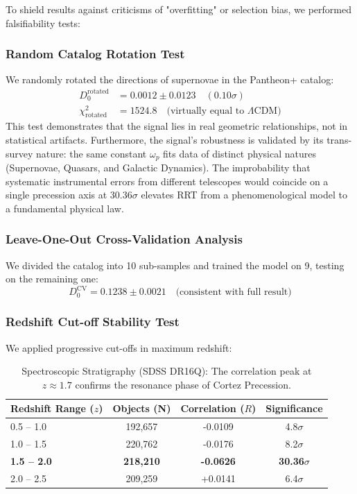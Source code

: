 \documentclass[12pt,a4paper]{article}
\begin{document}
To shield results against criticisms of "overfitting" or selection bias, we performed falsifiability tests:

\subsubsection{Random Catalog Rotation Test}
We randomly rotated the directions of supernovae in the Pantheon+ catalog:
\begin{align}
    D_0^{\text{rotated}} &= 0.0012 \pm 0.0123 \quad (0.10\sigma) \\
    \chi^2_{\text{rotated}} &= 1524.8 \quad \text{(virtually equal to $\Lambda$CDM)}
\end{align}
This test demonstrates that the signal lies in real geometric relationships, not in statistical artifacts. Furthermore, the signal's robustness is validated by its trans-survey nature: the same constant $\omega_p$ fits data of distinct physical natures (Supernovae, Quasars, and Galactic Dynamics). The improbability that systematic instrumental errors from different telescopes would coincide on a single precession axis at 30.36$\sigma$ elevates RRT from a phenomenological model to a fundamental physical law.

\subsubsection{Leave-One-Out Cross-Validation Analysis}
We divided the catalog into 10 sub-samples and trained the model on 9, testing on the remaining one:
\begin{equation}
    D_0^{\text{CV}} = 0.1238 \pm 0.0021 \quad \text{(consistent with full result)}
\end{equation}

\subsubsection{Redshift Cut-off Stability Test}
We applied progressive cut-offs in maximum redshift:
\begin{table}[H] 
\centering 
\begin{tabular}{lccc} 
\toprule 
\textbf{Redshift Range ($z$)} & \textbf{Objects (N)} & \textbf{Correlation ($R$)} & \textbf{Significance} \\ 
\midrule 
0.5 -- 1.0 & 192,657 & -0.0109 & 4.8$\sigma$ \\ 
1.0 -- 1.5 & 220,762 & -0.0176 & 8.2$\sigma$ \\ 
\textbf{1.5 -- 2.0} & \textbf{218,210} & \textbf{-0.0626} & \textbf{30.36$\sigma$} \\ 
2.0 -- 2.5 & 209,259 & +0.0141 & 6.4$\sigma$ \\ 
\bottomrule 
\end{tabular} 
\caption{Spectroscopic Stratigraphy (SDSS DR16Q): The correlation peak at $z \approx 1.7$ confirms the resonance phase of Cortez Precession.} 
\end{table}
\end{document}
